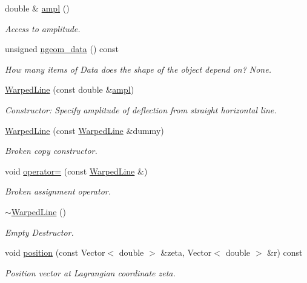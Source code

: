 \begin{DoxyCompactItemize}
double \& \hyperlink{classWarpedLine_ae43c2f997b9c0de62783375341ac5794}{ampl} ()
\begin{DoxyCompactList}\small\item\em Access to amplitude. \end{DoxyCompactList}\item 
unsigned \hyperlink{classWarpedLine_aa4157cd4ff2e80f33b106b7ed4e4d804}{ngeom\+\_\+data} () const
\begin{DoxyCompactList}\small\item\em How many items of Data does the shape of the object depend on? None. \end{DoxyCompactList}\item 
\hyperlink{classWarpedLine_a9d80dca2c907b426f7130579c94f3310}{Warped\+Line} (const double \&\hyperlink{classWarpedLine_ae43c2f997b9c0de62783375341ac5794}{ampl})
\begin{DoxyCompactList}\small\item\em Constructor\+: Specify amplitude of deflection from straight horizontal line. \end{DoxyCompactList}\item 
\hyperlink{classWarpedLine_a53a7426303864ea2d34aeba0a3f6324f}{Warped\+Line} (const \hyperlink{classWarpedLine}{Warped\+Line} \&dummy)
\begin{DoxyCompactList}\small\item\em Broken copy constructor. \end{DoxyCompactList}\item 
void \hyperlink{classWarpedLine_ae2ee796906c0caa7e94f277f6fc499e1}{operator=} (const \hyperlink{classWarpedLine}{Warped\+Line} \&)
\begin{DoxyCompactList}\small\item\em Broken assignment operator. \end{DoxyCompactList}\item 
\hyperlink{classWarpedLine_a4cb07fb7f06d42e2008afe65d8750cad}{$\sim$\+Warped\+Line} ()
\begin{DoxyCompactList}\small\item\em Empty Destructor. \end{DoxyCompactList}\item 
void \hyperlink{classWarpedLine_aaeef89818148ee3a305c561e91c8851d}{position} (const Vector$<$ double $>$ \&zeta, Vector$<$ double $>$ \&r) const
\begin{DoxyCompactList}\small\item\em Position vector at Lagrangian coordinate zeta. \end{DoxyCompactList}\item 

\end{DoxyCompactItemize}
